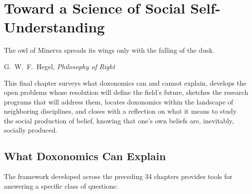 \chapter{Toward a Science of Social Self-Understanding}
\label{ch:toward}

\epigraph{The owl of Minerva spreads its wings only with the falling of the dusk.}{G.\ W.\ F.\ Hegel, \textit{Philosophy of Right}}

\noindent
This final chapter surveys what doxonomics can and cannot explain, develops the open problems whose resolution will define the field's future, sketches the research programs that will address them, locates doxonomics within the landscape of neighboring disciplines, and closes with a reflection on what it means to study the social production of belief, knowing that one's own beliefs are, inevitably, socially produced.

\section{What Doxonomics Can Explain}
\label{sec:ch35-can}

The framework developed across the preceding 34 chapters provides tools for answering a specific class of questions:

